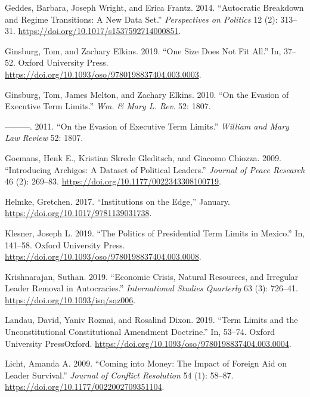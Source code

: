 \documentclass[
  12pt,
]{report}
\newlength{\cslhangindent}
\newenvironment{CSLReferences}[2] %
 {\begin{list}{}{%
  \setlength{\itemindent}{0pt}
  \setlength{\leftmargin}{0pt}
  \setlength{\parsep}{0pt}
  \ifodd #1
   \setlength{\leftmargin}{\cslhangindent}
   \setlength{\itemindent}{-1\cslhangindent}
  \fi
  \setlength{\itemsep}{#2\baselineskip}}}
 {\end{list}}
\begin{document}
\begin{CSLReferences}{1}{0}
Geddes, Barbara, Joseph Wright, and Erica Frantz. 2014. {``Autocratic
Breakdown and Regime Transitions: A New Data Set.''} \emph{Perspectives
on Politics} 12 (2): 313--31.
\url{https://doi.org/10.1017/s1537592714000851}.

Ginsburg, Tom, and Zachary Elkins. 2019. {``One Size Does Not Fit
All.''} In, 37--52. Oxford University Press.
\url{https://doi.org/10.1093/oso/9780198837404.003.0003}.

Ginsburg, Tom, James Melton, and Zachary Elkins. 2010. {``On the Evasion
of Executive Term Limits.''} \emph{Wm. \& Mary L. Rev.} 52: 1807.

---------. 2011. {``On the Evasion of Executive Term Limits.''}
\emph{William and Mary Law Review} 52: 1807.

Goemans, Henk E., Kristian Skrede Gleditsch, and Giacomo Chiozza. 2009.
{``Introducing Archigos: A Dataset of Political Leaders.''}
\emph{Journal of Peace Research} 46 (2): 269--83.
\url{https://doi.org/10.1177/0022343308100719}.

Helmke, Gretchen. 2017. {``Institutions on the Edge,''} January.
\url{https://doi.org/10.1017/9781139031738}.

Klesner, Joseph L. 2019. {``The Politics of Presidential Term Limits in
Mexico.''} In, 141--58. Oxford University Press.
\url{https://doi.org/10.1093/oso/9780198837404.003.0008}.

Krishnarajan, Suthan. 2019. {``Economic Crisis, Natural Resources, and
Irregular Leader Removal in Autocracies.''} \emph{International Studies
Quarterly} 63 (3): 726--41. \url{https://doi.org/10.1093/isq/sqz006}.

Landau, David, Yaniv Roznai, and Rosalind Dixon. 2019. {``Term Limits
and the Unconstitutional Constitutional Amendment Doctrine.''} In,
53--74. Oxford University PressOxford.
\url{https://doi.org/10.1093/oso/9780198837404.003.0004}.

Licht, Amanda A. 2009. {``Coming into Money: The Impact of Foreign Aid
on Leader Survival.''} \emph{Journal of Conflict Resolution} 54 (1):
58--87. \url{https://doi.org/10.1177/0022002709351104}.


\end{CSLReferences}
\end{document}
